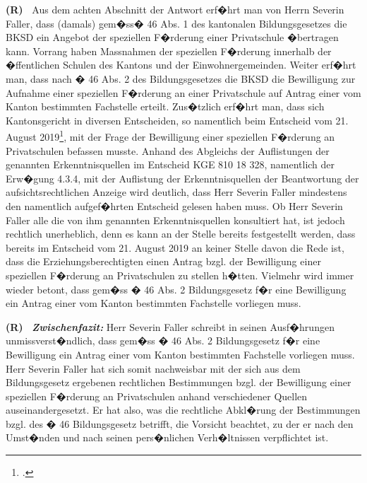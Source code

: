 \documentclass[paper=a4,fontsize=12pt, oneside, numbers=noenddot]{scrbook}
\newcounter{rz}
\newcommand{\RzLabel}[1]{\refstepcounter{rz}\label{#1}\textbf{(R\arabic{rz})~}}
\begin{document}
	\RzLabel{AntragSPD4AVS} Aus dem achten Abschnitt der Antwort erf�hrt man von Herrn Severin Faller, dass (damals) gem�ss� 46 Abs. 1 des kantonalen Bildungsgesetzes die BKSD ein Angebot der speziellen F�rderung einer Privatschule �bertragen kann. Vorrang haben Massnahmen der speziellen F�rderung innerhalb der �ffentlichen Schulen des Kantons und der Einwohnergemeinden. Weiter erf�hrt man, dass nach � 46 Abs. 2 des Bildungsgesetzes die BKSD die Bewilligung zur Aufnahme einer speziellen F�rderung an einer Privatschule auf Antrag einer vom Kanton bestimmten Fachstelle erteilt. Zus�tzlich erf�hrt man, dass sich Kantonsgericht in diversen Entscheiden, so namentlich beim Entscheid vom 21. August 2019\footcite[Erw. 4.3.4]{KGE81018328}, mit der Frage der Bewilligung einer speziellen F�rderung an Privatschulen befassen musste. Anhand des Abgleichs der Auflistungen der genannten Erkenntnisquellen im Entscheid KGE 810 18 328, namentlich der Erw�gung 4.3.4, mit der Auflistung der Erkenntnisquellen der Beantwortung der aufsichtsrechtlichen Anzeige wird deutlich, dass Herr Severin Faller mindestens den namentlich aufgef�hrten Entscheid gelesen haben muss. Ob Herr Severin Faller alle die von ihm genannten Erkenntnisquellen konsultiert hat, ist jedoch rechtlich unerheblich, denn es kann an der Stelle bereits festgestellt werden, dass bereits im Entscheid vom 21. August 2019 an keiner Stelle davon die Rede ist, dass die Erziehungsberechtigten einen Antrag bzgl. der Bewilligung einer speziellen F�rderung an Privatschulen zu stellen h�tten. Vielmehr wird immer wieder betont, dass gem�ss � 46 Abs. 2 Bildungsgesetz f�r eine Bewilligung ein Antrag einer vom Kanton bestimmten Fachstelle vorliegen muss. 
	
	\RzLabel{ZwischenfazitSF1} \textit{\textbf{Zwischenfazit:}} Herr Severin Faller schreibt in seinen Ausf�hrungen unmissverst�ndlich, dass gem�ss � 46 Abs. 2 Bildungsgesetz f�r eine Bewilligung ein Antrag einer vom Kanton bestimmten Fachstelle vorliegen muss. Herr Severin Faller hat sich somit nachweisbar mit der sich aus dem Bildungsgesetz ergebenen rechtlichen Bestimmungen bzgl. der Bewilligung einer speziellen F�rderung an Privatschulen anhand verschiedener Quellen auseinandergesetzt.  Er hat also, was die rechtliche Abkl�rung der Bestimmungen bzgl. des � 46 Bildungsgesetz betrifft, die Vorsicht beachtet, zu der er nach den Umst�nden und nach seinen pers�nlichen Verh�ltnissen verpflichtet ist. 
	
\end{document}
